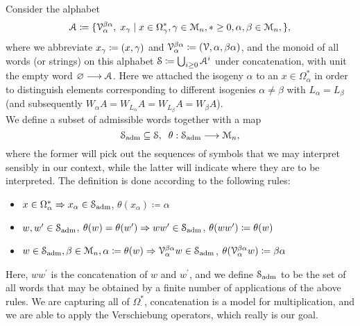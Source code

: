 \begin{defn}\label{def_admissible_words}
Consider the alphabet
\begin{equation*}
\mathcal{A} \coloneqq \{\mathcal{V}_\alpha^{\beta\alpha},\; x_\gamma \mid x \in \Omega^*_{\gamma}, \gamma \in \mathcal{M}_n, * \geq 0, \alpha, \beta \in \mathcal{M}_n,\},
\end{equation*}
where we abbreviate $x_\gamma \coloneqq (x,\gamma)$ and $\mathcal{V}_\alpha^{\beta\alpha} \coloneqq (\mathcal{V},\alpha,\beta\alpha)$, and the monoid of all words (or strings) on this alphabet $\mathcal{S} \coloneqq \bigcup_{i \geq 0} \mathcal{A}^i$ under concatenation, with unit the empty word $\varnothing \longrightarrow \mathcal{A}$. Here we attached the isogeny $\alpha$ to an $x \in \Omega^*_{\alpha}$ in order to distinguish elements corresponding to different isogenies $\alpha \neq \beta$ with $L_\alpha = L_\beta$ (and subsequently $W_\alpha A = W_{L_\alpha} A = W_{L_\beta} A = W_\beta A$).\\
We define a subset of admissible words together with a map
\begin{equation*}
  \cS_{\mathrm{adm}} \subseteq \cS,\;\; %
  \theta: \cS_{\mathrm{adm}} \to \cM_n,
\end{equation*}
where the former will pick out the sequences of symbols that we may interpret sensibly in our context, while the latter will indicate where they are to be interpreted. The definition is done according to the following rules:
\begin{itemize}
\item $x \in \Omega^*_{\alpha} \Rightarrow x_\alpha \in \mathcal{S}_{\mathrm{adm}}$, $\theta(x_\alpha) \coloneqq \alpha$
\item $w,w^\prime \in \mathcal{S}_{\mathrm{adm}}$, $\theta(w) = \theta(w^\prime) \Rightarrow ww^\prime \in \mathcal{S}_{\mathrm{adm}}$, %
    $\theta(ww^\prime) \coloneqq \theta(w)$
\item $w \in \mathcal{S}_{\mathrm{adm}}, \beta \in \mathcal{M}_n, \alpha \coloneqq \theta(w) \Rightarrow \mathcal{V}_\alpha^{\beta\alpha}w \in \mathcal{S}_{\mathrm{adm}}$, %
      $\theta(\mathcal{V}_\alpha^{\beta\alpha}w) \coloneqq \beta\alpha$
\end{itemize}
Here, $ww^\prime$ is the concatenation of $w$ and $w^\prime$, and we define $\mathcal{S}_\mathrm{adm}$ to be the set of all words that may be obtained by a finite number of applications of the above rules. We are capturing all of $\Omega^*_\cdot$, concatenation is a model for multiplication, and we are able to apply the Verschiebung operators, which really is our goal.


\end{defn}
